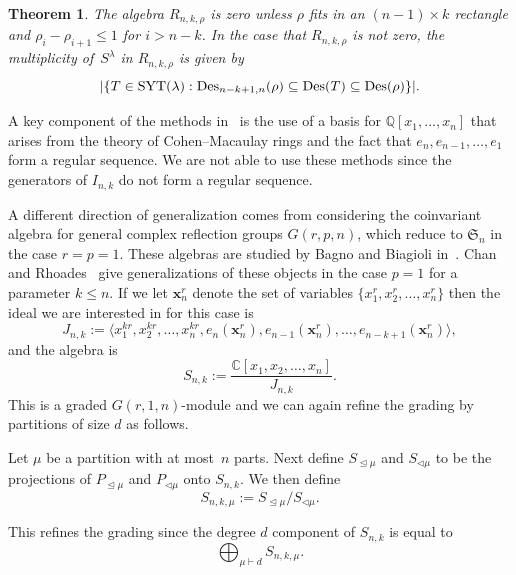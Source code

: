 \documentclass[10pt]{article}
\newcommand{\coloneqq}{:=}
\newtheorem{thm}{Theorem}[section]\newtheorem{lemm}[thm]{Lemma}\newtheorem{prop}[thm]{Proposition}
\begin{document}
\begin{thm}
\label{Result1}
	The algebra $R_{n,k,\rho}$ is zero unless $\rho$ fits in an $(n-1)\times k$ rectangle and $\rho_i-\rho_{i+1}\leq 1$ for 
$i>n-k$. In the case that $R_{n,k,\rho}$ is not zero, the multiplicity of~$S^\lambda$ in $R_{n,k,\rho}$ is given by 
\begin{equation}
\vert \{T\in \operatorname{SYT} (\lambda): \operatorname{Des} _{n-k+1,n}(\rho)\subseteq \operatorname{Des}(T)\subseteq \operatorname{Des}(\rho) \}\vert.
\end{equation}
\end{thm} 

A key component of the methods in~\cite{ABR} is the use of a basis for $\mathbb{Q}[x_1,\ldots, x_n]$ that arises from the 
theory of Cohen--Macaulay rings and the fact that $e_n, e_{n-1},\ldots, e_1$ form a regular sequence. We are not able to use 
these methods since the generators of $I_{n,k}$ do not form a regular sequence. 



A different direction of generalization comes from considering the coinvariant algebra for general complex reflection groups 
$G(r,p,n)$, which reduce to $\mathfrak{S}_n$ in the case $r=p=1$. These algebras are studied by Bagno and Biagioli in~\cite{BB}. Chan and Rhoades~\cite{CR} give generalizations of these objects in the case $p=1$ for a parameter $k\leq n$. If 
we let $\mathbf{x}_n^r$ denote the set of variables $\{x_1^r,x_2^r,\ldots, x_n^r\}$ then the ideal we are interested in for 
this case is 
\begin{equation}
J_{n,k}\coloneqq \langle x_1^{kr},x_2^{kr},\ldots, x_n^{kr}, 
e_n(\mathbf{x}_n^r),e_{n-1}(\mathbf{x}_n^r),\ldots, e_{n-k+1}(\mathbf{x}_n^r)\rangle,
\end{equation}
 and the algebra is 
		\begin{equation}
S_{n,k}\coloneqq \frac{\mathbb{C}[x_1,x_2,\ldots, x_n]}{J_{n,k}}.
\end{equation}
 This is a graded $G(r,1,n)$-module and we can again refine the grading by partitions of size $d$ as follows.
\begin{defi}

	Let $\mu$ be a partition with at most~$n$ parts. Next define $S_{\trianglelefteq\mu}$ and $S_{\triangleleft\mu}$ to be 
the projections of $P_{\trianglelefteq\mu}$ and $P_{\triangleleft\mu}$ onto $S_{n,k}$. We then define 
		\begin{equation}S_{n,k,\mu}\coloneqq S_{\trianglelefteq\mu}/S_{\triangleleft\mu}.
\end{equation}
\end{defi}
	This refines the grading since the degree $d$ component of $S_{n,k}$ is equal to 
		\begin{equation}
\bigoplus_{\mu\vdash d} S_{n,k,\mu}.
\end{equation}
\end{document}
